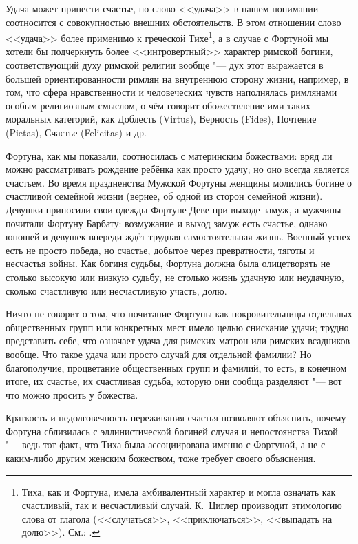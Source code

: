 Удача может принести счастье, но слово <<удача>> в нашем понимании соотносится с совокупностью внешних обстоятельств. В этом отношении слово <<удача>> более применимо к греческой Тихе\footnote{Тиха, как и Фортуна, имела амбивалентный характер и могла означать как счастливый, так и несчастливый случай. К.~Циглер производит этимологию слова  от глагола  (<<случаться>>, <<приключаться>>, <<выпадать на долю>>). См.: \cite[Sp. 1643--1644]{TycheZiegler1948}.}, а в случае с Фортуной мы хотели бы подчеркнуть более <<интровертный>> характер римской богини, соответствующий духу римской религии вообще "--- дух этот выражается в большей ориентированности римлян на внутреннюю сторону жизни, например, в том, что сфера нравственности и человеческих чувств наполнялась римлянами особым религиозным смыслом, о чём говорит обожествление ими таких моральных категорий, как Доблесть (Virtus), Верность (Fides), Почтение (Pietas), Счастье (Felicitas) и др.

Фортуна, как мы показали, соотносилась с материнским божествами: вряд ли можно рассматривать рождение ребёнка как просто удачу; но оно всегда является счастьем. Во время праздненства Мужской Фортуны женщины молились богине о счастливой семейной жизни (вернее, об одной из сторон семейной жизни). Девушки приносили свои одежды Фортуне-Деве при выходе замуж, а мужчины почитали Фортуну Барбату: возмужание и выход замуж есть счастье, однако юношей и девушек впереди ждёт трудная самостоятельная жизнь. Военный успех есть не просто победа, но счастье, добытое через превратности, тяготы и несчастья войны. Как богиня судьбы, Фортуна должна была олицетворять не столько высокую или низкую судьбу, не столько жизнь удачную или неудачную, сколько счастливую или несчастливую участь, долю.

Ничто не говорит о том, что почитание Фортуны как покровительницы отдельных общественных групп или конкретных мест имело целью снискание удачи; трудно представить себе, что означает удача для римских матрон или римских всадников вообще. Что такое удача или просто случай для отдельной фамилии? Но благополучие, процветание общественных групп и фамилий, то есть, в конечном итоге, их счастье, их счастливая судьба, которую они сообща разделяют "--- вот что можно просить у божества.

Краткость и недолговечность переживания счастья позволяют объяснить, почему Фортуна сблизилась с эллинистической богиней случая и непостоянства Тихой "--- ведь тот факт, что Тиха была ассоциирована именно с Фортуной, а не с каким-либо другим женским божеством, тоже требует своего объяснения.


